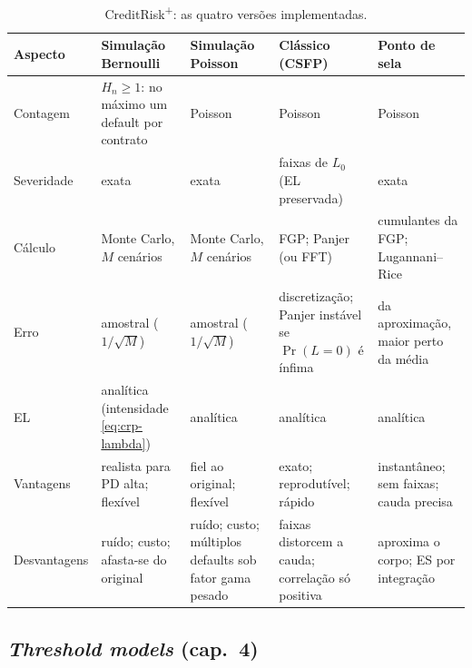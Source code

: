 \documentclass[11pt,a4paper]{article}
\begin{document}
\begin{table}[H]
\centering
\footnotesize
\begin{tabular}{>{\raggedright\arraybackslash}p{2.0cm}>{\raggedright\arraybackslash}p{3.0cm}>{\raggedright\arraybackslash}p{3.0cm}>{\raggedright\arraybackslash}p{3.0cm}>{\raggedright\arraybackslash}p{3.0cm}}
\toprule
Aspecto & Simulação Bernoulli & Simulação Poisson & Clássico (CSFP) & Ponto de sela \\
\midrule
Contagem & $H_n\ge1$: no máximo um default por contrato & Poisson & Poisson & Poisson \\
Severidade & exata & exata & faixas de $L_0$ (EL preservada) & exata \\
Cálculo & Monte Carlo, $M$ cenários & Monte Carlo, $M$ cenários & FGP; Panjer (ou FFT) & cumulantes da FGP; Lugannani--Rice \\
Erro & amostral ($1/\sqrt{M}$) & amostral ($1/\sqrt{M}$) & discretização; Panjer instável se $\Pr(L=0)$ é ínfima & da aproximação, maior perto da média \\
EL & analítica (intensidade \eqref{eq:crp-lambda}) & analítica & analítica & analítica \\
Vantagens & realista para PD alta; flexível & fiel ao original; flexível & exato; reprodutível; rápido & instantâneo; sem faixas; cauda precisa \\
Desvantagens & ruído; custo; afasta-se do original & ruído; custo; múltiplos defaults sob fator gama pesado & faixas distorcem a cauda; correlação só positiva & aproxima o corpo; ES por integração \\
\bottomrule
\end{tabular}
\caption{CreditRisk\textsuperscript{+}: as quatro versões implementadas.}
\label{tab:crplus-versoes}
\end{table}

\subsection{\emph{Threshold models} (cap.~4)}
\end{document}
